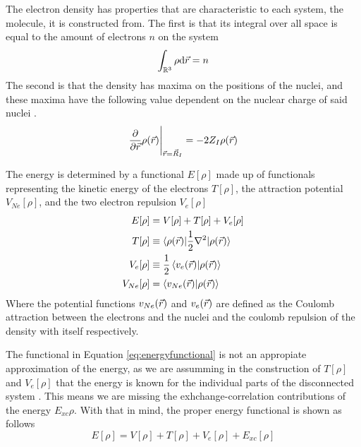 \documentclass[../master_thesis.tex]{subfiles}
\begin{document}
The electron density has properties that are characteristic to each system, the
molecule,  it is constructed from. The first is that its integral over all space
is equal to the amount of electrons $n$ on the system \cite{Cramer:2004}
\begin{equation}
  \int_{\mathbb{R}^3}\rho \text{d}\vec{r} = n
\end{equation}
The second is that the density has maxima on the positions of the nuclei, and
these maxima have the following value dependent on the nuclear charge of said
nuclei \cite{Cramer:2004}.
\begin{equation}
 \frac{\partial}{\partial \vec{r}}\rho(\vec{r})\Bigg|_{\vec{r} = \vec{R}_I} = -2Z_I\rho(\vec{r})
\end{equation}

The energy is determined by a functional $E[\rho]$ made up of functionals representing
the kinetic energy of the electrons $T[\rho]$, the attraction potential $V_{Ne}[\rho]$,
and the two electron repulsion $V_{e}[\rho]$ \cite{Sorland, PhysRev.136.B864}
\begin{align}
  E[\rho] &= V[\rho] + T[\rho] + V_{e}[\rho]\\\label{eq:energyfunctional}
  T[\rho] &\equiv\braket{\rho(\vec{r})| \frac{1}{2}\nabla^2| \rho(\vec{r})} \\
  V_{e}[\rho] &\equiv \frac{1}{2}\braket{v_{e}(\vec{r})| \rho(\vec{r})}\\
  V_{Ne}[\rho] &= \braket{v_{Ne}(\vec{r})|\rho(\vec{r})}
\end{align}
Where the potential functions $v_{Ne}(\vec{r})$  and $v_{e}(\vec{r})$ are defined as the Coulomb
attraction between the electrons and the nuclei and the coulomb repulsion of the
density with itself \cite{Sorland} respectively.

The functional in Equation \ref{eq:energyfunctional} is not an appropiate approximation
of the energy, as we are assumming in the construction of $T[\rho]$ and $V_{e}[\rho]$
that the energy is known for the individual parts of the disconnected system \cite{Sorland}.
This means we are missing the exhchange-correlation contributions of the energy $E_{xc}{\rho}$.
With that in mind, the proper energy functional is shown as follows
\begin{equation}\label{eq:adjustedenergyfunc}
  E[\rho] = V[\rho] + T[\rho] + V_{e}[\rho] + E_{xc}[\rho]
\end{equation}
\end{document}

